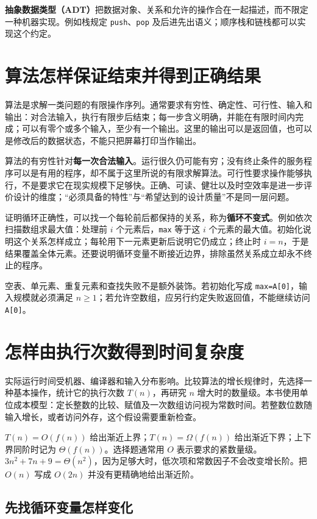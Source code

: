 \textbf{抽象数据类型（ADT）}把数据对象、关系和允许的操作合在一起描述，而不限定一种机器实现。例如栈规定 \texttt{push}、\texttt{pop} 及后进先出语义；顺序栈和链栈都可以实现这个约定。

\section{算法怎样保证结束并得到正确结果}\label{ds-01-02}

算法是求解一类问题的有限操作序列。通常要求有穷性、确定性、可行性、输入和输出：对合法输入，执行有限步后结束；每一步含义明确，并能在有限时间内完成；可以有零个或多个输入，至少有一个输出。这里的输出可以是返回值，也可以是修改后的数据状态，不能只把屏幕打印当作输出。

算法的有穷性针对\textbf{每一次合法输入}。运行很久仍可能有穷；没有终止条件的服务程序可以是有用的程序，却不属于这里所说的有限求解算法。可行性要求操作能够执行，不是要求它在现实规模下足够快。正确、可读、健壮以及时空效率是进一步评价设计的维度；``必须具备的特性''与``希望达到的设计质量''不是同一层问题。

证明循环正确性，可以找一个每轮前后都保持的关系，称为\textbf{循环不变式}。例如依次扫描数组求最大值：处理前 \(i\) 个元素后，\texttt{max} 等于这 \(i\) 个元素的最大值。初始化说明这个关系怎样成立；每轮用下一元素更新后说明它仍成立；终止时 \(i=n\)，于是结果覆盖全体元素。还要说明循环变量不断接近边界，排除虽然关系成立却永不终止的程序。

空表、单元素、重复元素和查找失败不是额外装饰。若初始化写成 \texttt{max=A{[}0{]}}，输入规模就必须满足 \(n\ge1\)；若允许空数组，应另行约定失败返回值，不能继续访问 \texttt{A{[}0{]}}。

\section{怎样由执行次数得到时间复杂度}\label{ds-01-03}

实际运行时间受机器、编译器和输入分布影响。比较算法的增长规律时，先选择一种基本操作，统计它的执行次数 \(T(n)\)，再研究 \(n\) 增大时的数量级。本书使用单位成本模型：定长整数的比较、赋值及一次数组访问视为常数时间。若整数位数随输入增长，或者访问外存，这个假设需要重新检查。

\(T(n)=O(f(n))\) 给出渐近上界；\(T(n)=\Omega(f(n))\) 给出渐近下界；上下界同阶时记为 \(\Theta(f(n))\)。选择题通常用 \(O\) 表示要求的紧数量级。\(3n^2+7n+9=\Theta(n^2)\)，因为足够大时，低次项和常数因子不会改变增长阶。把 \(O(n)\) 写成 \(O(2n)\) 并没有更精确地给出渐近阶。

\subsection{先找循环变量怎样变化}\label{ds-c01-h41}

